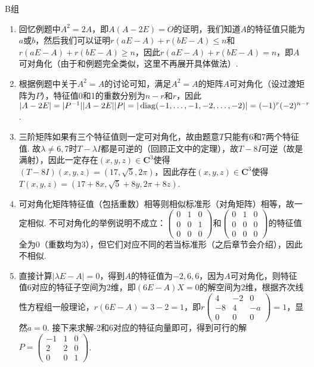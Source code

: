 \centerline{\heiti B组}
\begin{enumerate}
    \item 回忆例题中$A^2=2A$，即$A(A-2E)=O$的证明，我们知道$A$的特征值只能为$a$或$b$，然后我们可以证明$r(aE-A)+r(bE-A)\leqslant n$和$r(aE-A)+r(bE-A)\geqslant n$，因此$r(aE-A)+r(bE-A)=n$，即$A$可对角化（由于和例题完全类似，这里不再展开具体做法）.

    \item 根据例题中关于$A^2=A$的讨论可知，满足$A^2=A$的矩阵$A$可对角化（设过渡矩阵为$P$），特征值0和1的重数分别为$n-r$和$r$，因此$|A-2E|=|P^{-1}||A-2E||P|=|\operatorname{diag}(-1,\ldots,-1,-2,\ldots,-2)|=(-1)^r(-2)^{n-r}$.

    \item 三阶矩阵如果有三个特征值则一定可对角化，故由题意$T$只能有6和7两个特征值. 故$\lambda\neq 6,7$时$T-\lambda I$都是可逆的（回顾正文中的定理），故$T-8I$可逆（故是满射），因此一定存在$(x,y,z)\in\mathbf{C}^3$使得$(T-8I)(x,y,z)=(17,\sqrt{5},2\pi)$，因此存在$(x,y,z)\in\mathbf{C}^3$使得$T(x,y,z)=(17+8x,\sqrt{5}+8y,2\pi+8z)$.

    \item 可对角化矩阵特征值（包括重数）相等则相似标准形（对角矩阵）相等，故一定相似. 不可对角化的举例说明不成立：$\begin{pmatrix}
                  0 & 1 & 0 \\ 0 & 0 & 1 \\ 0 & 0 & 0
              \end{pmatrix}$和$\begin{pmatrix}
                  0 & 1 & 0 \\ 0 & 0 & 0 \\ 0 & 0 & 0
              \end{pmatrix}$的特征值全为0（重数均为3），但它们对应不同的若当标准形（之后章节会介绍），因此不相似.

    \item 直接计算$|\lambda E-A|=0$，得到$A$的特征值为$-2,6,6$，因为$A$可对角化，则特征值6对应的特征子空间为2维，即$(6E-A)X=0$的解空间为2维，根据齐次线性方程组一般理论，$r(6E-A)=3-2=1$，即$r\begin{pmatrix}
                  4 & -2 & 0 \\ -8 & 4 & -a \\ 0 & 0 & 0
              \end{pmatrix}=1$，显然$a=0$. 接下来求解-2和6对应的特征向量即可，得到可行的解$P=\begin{pmatrix}
                  -1 & 1 & 0 \\ 2 & 2 & 0 \\ 0 & 0 & 1
              \end{pmatrix}$.


\end{enumerate}
